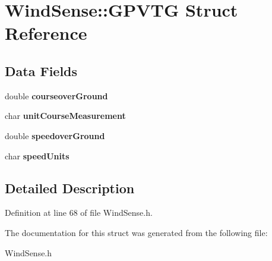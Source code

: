 \hypertarget{structWindSense_1_1GPVTG}{
\section{\-Wind\-Sense\-:\-:\-G\-P\-V\-T\-G \-Struct \-Reference}
\label{structWindSense_1_1GPVTG}
}
\subsection*{\-Data \-Fields}
\begin{DoxyCompactItemize}
\item 
\hypertarget{structWindSense_1_1GPVTG_a03d56926a82a1ff48f0796d7b03c95b1}{
double {\bfseries courseover\-Ground}}
\label{structWindSense_1_1GPVTG_a03d56926a82a1ff48f0796d7b03c95b1}

\item 
\hypertarget{structWindSense_1_1GPVTG_a06d286b75386d8d7ab0e2343ece7060b}{
char {\bfseries unit\-Course\-Measurement}}
\label{structWindSense_1_1GPVTG_a06d286b75386d8d7ab0e2343ece7060b}

\item 
\hypertarget{structWindSense_1_1GPVTG_a4e3a8d4405b839b4cec726e1d6083bb8}{
double {\bfseries speedover\-Ground}}
\label{structWindSense_1_1GPVTG_a4e3a8d4405b839b4cec726e1d6083bb8}

\item 
\hypertarget{structWindSense_1_1GPVTG_af0e6b88f4ffda74f8e3df25873ddb0f2}{
char {\bfseries speed\-Units}}
\label{structWindSense_1_1GPVTG_af0e6b88f4ffda74f8e3df25873ddb0f2}

\end{DoxyCompactItemize}


\subsection{\-Detailed \-Description}


\-Definition at line 68 of file \-Wind\-Sense.\-h.



\-The documentation for this struct was generated from the following file\-:\begin{DoxyCompactItemize}
\item 
\-Wind\-Sense.\-h\end{DoxyCompactItemize}
